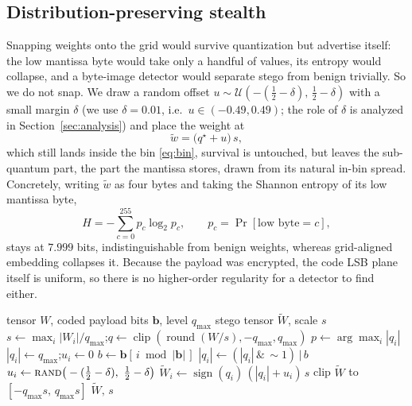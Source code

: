 \documentclass[a4paper,fleqn]{cas-dc}
\theoremstyle{plain}
\theoremstyle{remark}
\begin{document}
\subsection{Distribution-preserving stealth}
Snapping weights onto the grid would survive quantization but advertise itself: the
low mantissa byte would take only a handful of values, its entropy would collapse, and
a byte-image detector would separate stego from benign trivially. So we do not snap.
We draw a random offset $u\sim\mathcal{U}(-(\tfrac12-\delta),\,\tfrac12-\delta)$ with a
small margin $\delta$ (we use $\delta=0.01$, i.e.\ $u\in(-0.49,0.49)$; the role of $\delta$
is analyzed in Section~\ref{sec:analysis}) and place the weight at
\begin{equation}\label{eq:embed}
\tilde w=\big(q^\star+u\big)\,s,
\end{equation}
which still lands inside the bin \eqref{eq:bin}, survival is untouched, but
leaves the sub-quantum part, the part the mantissa stores, drawn from its natural
in-bin spread. Concretely, writing $\tilde w$ as four bytes and taking the Shannon
entropy of its low mantissa byte,
\begin{equation}\label{eq:entropy}
H=-\sum_{c=0}^{255} p_c\log_2 p_c,\qquad p_c=\Pr[\text{low byte}=c],
\end{equation}
stays at $7.999$ bits, indistinguishable from benign weights, whereas grid-aligned
embedding collapses it. Because the payload was encrypted, the code LSB plane itself is
uniform, so there is no higher-order regularity for a detector to find either.

\begin{algorithm}[t]
\caption{Quantization-aware stealthy embedding (per weight tensor)}
\label{alg:embed}
\begin{algorithmic}[1]
\Require tensor $W$, coded payload bits $\mathbf b$, level $q_{\max}$
\Ensure stego tensor $\tilde W$, scale $s$
\State $s\gets \max_i|W_i|/q_{\max}$;\quad $q\gets\operatorname{clip}(\operatorname{round}(W/s),-q_{\max},q_{\max})$
\State $p\gets\arg\max_i|q_i|$ 
   
    \State $|q_i|\gets q_{\max}$;\quad $u_i\gets 0$
  \Else
    \State $b\gets \mathbf b[\,i \bmod |\mathbf b|\,]$ 
    \State $|q_i|\gets(|q_i|\,\&\,{\sim}1)\,\vert\,b$ 
    \State $u_i\gets\textsc{rand}\big(-(\tfrac12-\delta),\ \tfrac12-\delta\big)$ 
  \EndIf
  \State $\tilde W_i\gets\operatorname{sign}(q_i)\,(|q_i|+u_i)\,s$
\EndFor
\State clip $\tilde W$ to $[-q_{\max}s,\,q_{\max}s]$ 
\State \Return $\tilde W,\,s$
\end{algorithmic}
\end{algorithm}
\end{document}
